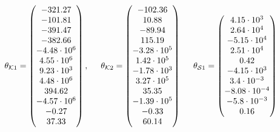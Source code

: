  \begin{equation}
\label{par_matrices_output_example123}
         \theta_{\mathcal{K}1} = 
          \begin{pmatrix}
           -321.27  \\
           -101.81  \\
           -391.47  \\
           -382.66  \\
           -4.48 \cdot 10^6  \\
           4.55 \cdot 10^6 \\
           9.23 \cdot 10^3 \\
           4.48 \cdot 10^6 \\
           394.62 \\
           -4.57 \cdot 10^6\\
           -0.27 \\
           37.33 \\
         \end{pmatrix}
         ,
         \hspace{5mm}
         \theta_{\mathcal{K}2} = 
          \begin{pmatrix}
           -102.36  \\
           10.88  \\
           -89.94  \\
           115.19  \\
           -3.28 \cdot 10^5  \\
           1.42 \cdot 10^5 \\
           -1.78 \cdot 10^3 \\
           3.27 \cdot 10^5 \\
           35.35 \\
           -1.39 \cdot 10^5\\
           -0.33 \\
           60.14 \\
         \end{pmatrix}
\hspace{5mm}
         \theta_{\mathcal{S}1} = 
          \begin{pmatrix}
           4.15 \cdot 10^{3} \\
            2.64 \cdot 10^{4} \\
             -5.15 \cdot 10^{4} \\
              2.51 \cdot 10^{4} \\
               0.42 \\
                -4.15 \cdot 10^{3} \\
                  3.4 \cdot 10^{-3} \\
                   -8.08 \cdot 10^{-4} \\
                   -5.8 \cdot 10^{-3} \\
                    0.16 

         \end{pmatrix}
\end{equation}

